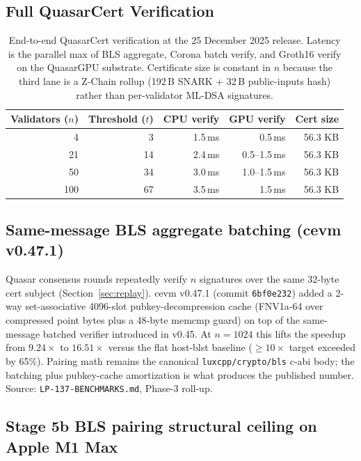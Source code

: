 \subsection{Full QuasarCert Verification}

\begin{table}[ht]
\centering
\small
\begin{tabular}{@{}rrrrr@{}}
\toprule
\textbf{Validators ($n$)} & \textbf{Threshold ($t$)} &
\textbf{CPU verify} & \textbf{GPU verify} &
\textbf{Cert size} \\
\midrule
4   & 3   & 1.5\,ms  & 0.5\,ms  & 56.3 KB \\
21  & 14  & 2.4\,ms  & 0.5--1.5\,ms & 56.3 KB \\
50  & 34  & 3.0\,ms  & 1.0--1.5\,ms & 56.3 KB \\
100 & 67  & 3.5\,ms  & 1.5\,ms  & 56.3 KB \\
\bottomrule
\end{tabular}
\caption{End-to-end QuasarCert verification at the 25 December 2025
release. Latency is the parallel max of BLS aggregate, Corona batch
verify, and Groth16 verify on the QuasarGPU substrate. Certificate size
is constant in $n$ because the third lane is a Z-Chain rollup
(192\,B SNARK + 32\,B public-inputs hash) rather than per-validator
ML-DSA signatures.}
\label{tab:full-verify}
\end{table}

\subsection{Same-message BLS aggregate batching (cevm v0.47.1)}

Quasar consensus rounds repeatedly verify $n$ signatures over the
same 32-byte cert subject (Section~\ref{sec:replay}). cevm v0.47.1
(commit \texttt{6bf0e232}) added a 2-way set-associative 4096-slot
pubkey-decompression cache (FNV1a-64 over compressed point bytes plus
a 48-byte memcmp guard) on top of the same-message batched verifier
introduced in v0.45. At $n{=}1024$ this lifts the speedup from
$9.24\times$ to $\mathbf{16.51\times}$ versus the flat host-blst
baseline ($\geq 10\times$ target exceeded by 65\%). Pairing math
remains the canonical \texttt{luxcpp/crypto/bls} c-abi body; the
batching plus pubkey-cache amortization is what produces the
published number. Source: \texttt{LP-137-BENCHMARKS.md}, Phase-3
roll-up.

\subsection{Stage 5b BLS pairing structural ceiling on Apple M1 Max}

